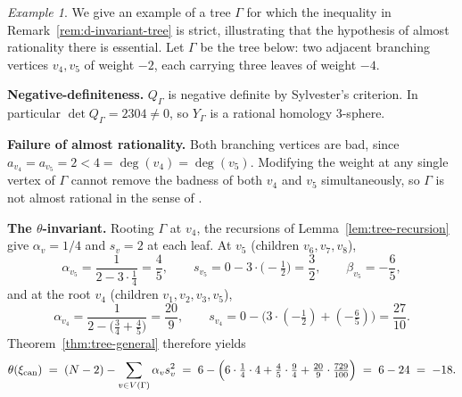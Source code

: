 \documentclass[11pt]{amsart}
\theoremstyle{plain}
\theoremstyle{definition}
\theoremstyle{remark}
\newtheorem{example}[theorem]{Example}
\begin{document}
\begin{example}\label{ex:non-AR}
We give an example of a tree $\Gamma$ for which the inequality in
Remark~\ref{rem:d-invariant-tree} is strict, illustrating that the
hypothesis of almost rationality there is essential. Let $\Gamma$ be
the tree below: two adjacent branching vertices $v_4, v_5$ of weight
$-2$, each carrying three leaves of weight $-4$.

\begin{center}
\end{center}

\medskip
\noindent\textbf{Negative-definiteness.}  $Q_\Gamma$ is negative definite by Sylvester's
criterion. In particular $\det Q_\Gamma = 2304 \neq 0$, so
$Y_\Gamma$ is a rational homology 3-sphere.

\medskip
\noindent\textbf{Failure of almost rationality.} Both branching
vertices are bad, since $a_{v_4}=a_{v_5}=2 < 4 = \deg(v_4)=\deg(v_5)$.
Modifying the weight at any single vertex of $\Gamma$ cannot remove
the badness of both $v_4$ and $v_5$ simultaneously, so $\Gamma$ is not
almost rational in the sense of \cite{Nemethi2005}.

\medskip
\noindent\textbf{The $\theta$-invariant.} Rooting $\Gamma$ at $v_4$,
the recursions of Lemma~\ref{lem:tree-recursion} give
$\alpha_v = 1/4$ and $s_v = 2$ at each leaf. At $v_5$ (children
$v_6, v_7, v_8$),
\[
\alpha_{v_5} = \frac{1}{2 - 3 \cdot \tfrac{1}{4}} = \frac{4}{5},
\qquad
s_{v_5} = 0 - 3\cdot\bigl(-\tfrac{1}{2}\bigr) = \frac{3}{2},
\qquad
\beta_{v_5} = -\frac{6}{5},
\]
and at the root $v_4$ (children $v_1, v_2, v_3, v_5$),
\[
\alpha_{v_4} = \frac{1}{2 - \bigl(\tfrac{3}{4}+\tfrac{4}{5}\bigr)} = \frac{20}{9},
\qquad
s_{v_4} = 0 - \bigl(3\cdot(-\tfrac{1}{2}) + (-\tfrac{6}{5})\bigr) = \frac{27}{10}.
\]
Theorem~\ref{thm:tree-general} therefore yields
\[
\theta(\xi_{\rm can})
\;=\;
(N-2) - \sum_{v \in V(\Gamma)} \alpha_v s_v^2
\;=\;
6 - \Bigl(6 \cdot \tfrac{1}{4} \cdot 4 + \tfrac{4}{5}\cdot\tfrac{9}{4} + \tfrac{20}{9}\cdot\tfrac{729}{100}\Bigr)
\;=\;
6 - 24
\;=\;
-18.
\]


\end{example}
\end{document}
